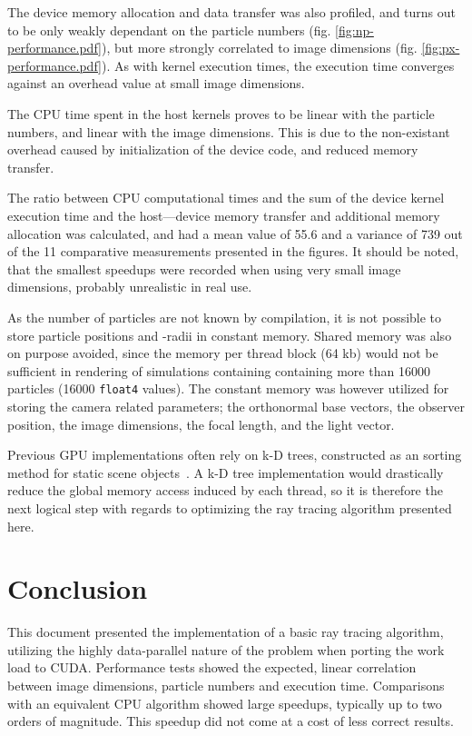 \documentclass[journal]{IEEEtran}
\begin{document}
The device memory allocation and data transfer was also profiled, and turns out to be only weakly dependant on the particle numbers (fig. \ref{fig:np-performance.pdf}), but more strongly correlated to image dimensions (fig. \ref{fig:px-performance.pdf}). As with kernel execution times, the execution time converges against an overhead value at small image dimensions.

The CPU time spent in the host kernels proves to be linear with the particle numbers, and linear with the image dimensions. This is due to the non-existant overhead caused by initialization of the device code, and reduced memory transfer.

The ratio between CPU computational times and the sum of the device kernel execution time and the host---device memory transfer and additional memory allocation was calculated, and had a mean value of \num{55.6} and a variance of \num{739} out of the 11 comparative measurements presented in the figures. It should be noted, that the smallest speedups were recorded when using very small image dimensions, probably unrealistic in real use.

As the number of particles are not known by compilation, it is not possible to store particle positions and -radii in constant memory. Shared memory was also on purpose avoided, since the memory per thread block (64 kb) would not be sufficient in rendering of simulations containing containing more than \num{16000} particles (\num{16000} \texttt{float4} values). The constant memory was however utilized for storing the camera related parameters; the orthonormal base vectors, the observer position, the image dimensions, the focal length, and the light vector.

Previous GPU implementations often rely on k-D trees, constructed as an sorting method for static scene objects \cite{Horn:2007,Popov:2007}. A k-D tree implementation would drastically reduce the global memory access induced by each thread, so it is therefore the next logical step with regards to optimizing the ray tracing algorithm presented here.

\section{Conclusion}
This document presented the implementation of a basic ray tracing algorithm, utilizing the highly data-parallel nature of the problem when porting the work load to CUDA.
Performance tests showed the expected, linear correlation between image dimensions, particle numbers and execution time. Comparisons with an equivalent CPU algorithm showed large speedups, typically up to two orders of magnitude. This speedup did not come at a cost of less correct results.
\end{document}
